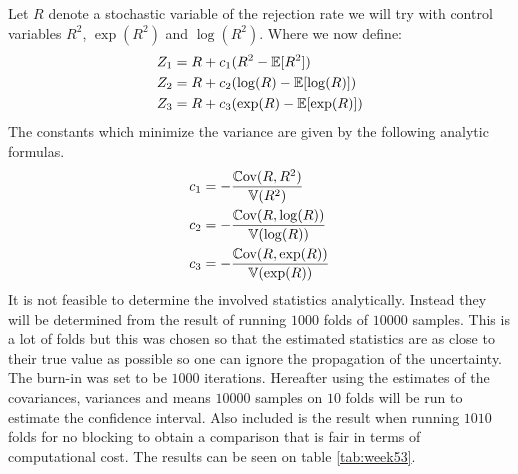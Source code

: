 Let $R$ denote a stochastic variable of the rejection rate we will try with control variables $R^2$, $\exp(R^2)$ and $\log(R^2)$. Where we now define:
\begin{align}
    Z_1 &= R + c_1 (R^2 - \operatorname{\mathbb{E}}[R^2])\\
    Z_2 &= R + c_2 (\log(R)-\operatorname{\mathbb{E}}[\log(R)]) \\
    Z_3 &= R + c_3 (\exp(R)-\operatorname{\mathbb{E}}[\exp(R)])
\end{align}
The constants which minimize the variance are given by the following analytic formulas.
\begin{align}
    c_1 & = -\frac{\operatorname{\mathbb{C}\text{ov}}(R,R^2)}{\operatorname{\mathbb{V}}(R^2)} \\
    c_2 & = -\frac{\operatorname{\mathbb{C}\text{ov}}(R,\log(R))}{\operatorname{\mathbb{V}}(\log(R))} \\
    c_3 & = -\frac{\operatorname{\mathbb{C}\text{ov}}(R,\exp(R))}{\operatorname{\mathbb{V}}(\exp(R))}
\end{align}
It is not feasible to determine the involved statistics analytically. Instead they will be determined from the result of running $1000$ folds of $10000$ samples. This is a lot of folds but this was chosen so that the estimated statistics are as close to their true value as possible so one can ignore the propagation of the uncertainty. The burn-in was set to be $1000$ iterations. Hereafter using the estimates of the covariances, variances and means $10000$ samples on $10$ folds will be run to estimate the confidence interval. Also included is the result when running $1010$ folds for no blocking to obtain a comparison that is fair in terms of computational cost.  The results can be seen on table \ref{tab:week53}. 


